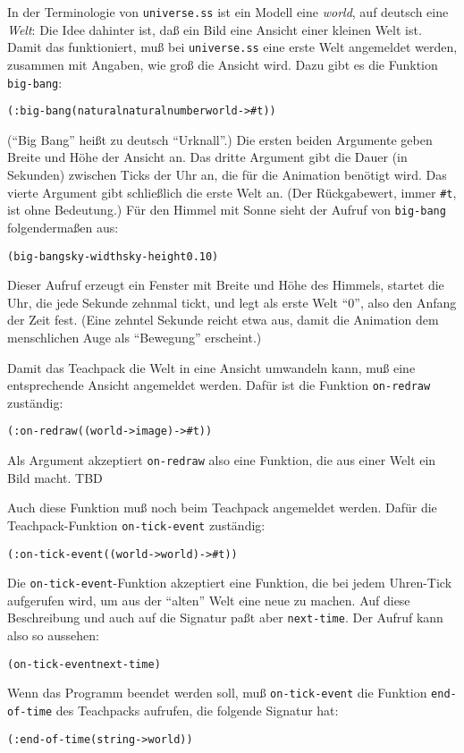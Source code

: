 In der Terminologie von \texttt{universe.ss} ist ein Modell eine
\textit{world}, auf deutsch eine \textit{Welt}: Die Idee dahinter
ist, daß ein Bild eine Ansicht einer kleinen Welt ist.  Damit das
funktioniert, muß bei \texttt{universe.ss} eine erste Welt angemeldet
werden, zusammen mit Angaben, wie groß die Ansicht wird.  Dazu gibt es
die Funktion \texttt{big-bang}:
%
\begin{alltt}
(: big-bang (natural natural number world -> #t))
\end{alltt}
%
("`Big Bang"' heißt zu deutsch "`Urknall"'.)
Die ersten beiden Argumente geben Breite und Höhe der Ansicht an.  Das
dritte Argument gibt die Dauer (in Sekunden) zwischen Ticks der Uhr
an, die für die Animation benötigt wird.  Das vierte Argument gibt
schließlich die erste Welt an.  (Der Rückgabewert, immer
\verb|#t|, ist ohne Bedeutung.)  Für den Himmel mit
Sonne sieht der Aufruf von \texttt{big-bang} folgendermaßen aus:
%
\begin{alltt}
(big-bang sky-width sky-height 0.1 0)
\end{alltt}
%
Dieser Aufruf erzeugt ein Fenster mit Breite und Höhe des Himmels,
startet die Uhr, die jede Sekunde zehnmal tickt, und legt als erste
Welt "`0"', also den Anfang der Zeit fest.  (Eine zehntel Sekunde
reicht etwa aus, damit die Animation dem menschlichen Auge als
"`Bewegung"' erscheint.)

Damit das Teachpack die Welt in eine Ansicht umwandeln kann, muß eine
entsprechende Ansicht angemeldet werden.  Dafür ist die Funktion
\texttt{on-redraw} zuständig:
%
\begin{alltt}
(: on-redraw ((world -> image) -> #t))
\end{alltt}
%
Als Argument akzeptiert \texttt{on-redraw} also eine Funktion, die aus
einer Welt ein Bild macht.  TBD

Auch diese Funktion muß noch beim Teachpack angemeldet werden.  Dafür
die Teachpack-Funktion
\texttt{on-tick-event}
zuständig:
%
\begin{alltt}
(: on-tick-event ((world -> world) -> #t))
\end{alltt}
%
Die \texttt{on-tick-event}-Funktion akzeptiert eine Funktion, die bei
jedem Uhren-Tick aufgerufen wird, um aus der "`alten"' Welt eine neue
zu machen.  Auf diese Beschreibung und auch auf die Signatur
paßt aber \texttt{next-time}.  Der Aufruf kann also so aussehen:
%
\begin{alltt}
(on-tick-event next-time)
\end{alltt}
%
Wenn das Programm
beendet werden soll, muß \texttt{on-tick-event} die Funktion
\texttt{end-of-time} des
Teachpacks aufrufen, die folgende Signatur hat:
%
\begin{alltt}
(: end-of-time (string -> world))
\end{alltt}
%

